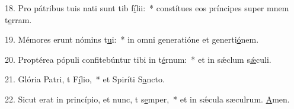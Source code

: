 18. Pro pátribus tuis nati sunt tib f\uline{í}lii:~* constítues eos príncipes super mnem t\uline{e}rram.\par 
19. Mémores erunt nómins t\uline{u}i:~* in omni generatióne et generti\uline{ó}nem.\par 
20. Proptérea pópuli confitebúntur tibi in t\uline{é}rnum:~* et in sǽclum s\uline{ǽ}culi.\par 
21. Glória Patri, t F\uline{í}lio,~* et Spiríti S\uline{a}ncto.\par 
22. Sicut erat in princípio, et nunc, t s\uline{e}mper,~* et in sǽcula sæculrum. \uline{A}men.\par 
